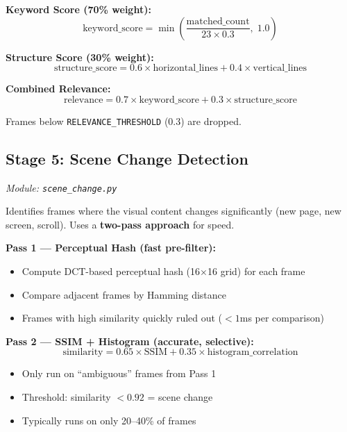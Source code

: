 \documentclass[12pt, a4paper]{article}
\newcommand{\codeinline}[1]{\texttt{\small\colorbox{codebg}{#1}}}
\newcommand{\filepath}[1]{\texttt{\small #1}}
\begin{document}
\textbf{Keyword Score (70\% weight):}
\begin{equation}
    \text{keyword\_score} = \min\!\left(\frac{\text{matched\_count}}{23 \times 0.3},\; 1.0\right)
\end{equation}

\textbf{Structure Score (30\% weight):}
\begin{equation}
    \text{structure\_score} = 0.6 \times \text{horizontal\_lines} + 0.4 \times \text{vertical\_lines}
\end{equation}

\textbf{Combined Relevance:}
\begin{equation}
    \text{relevance} = 0.7 \times \text{keyword\_score} + 0.3 \times \text{structure\_score}
\end{equation}

Frames below \codeinline{RELEVANCE\_THRESHOLD} (0.3) are dropped.

\subsection{Stage 5: Scene Change Detection}
\label{sec:adaptive}
\textit{Module: \filepath{scene\_change.py}}

Identifies frames where the visual content changes significantly (new page, new screen, scroll). Uses a \textbf{two-pass approach} for speed.

\textbf{Pass 1 --- Perceptual Hash (fast pre-filter):}
\begin{itemize}
    \item Compute DCT-based perceptual hash (16$\times$16 grid) for each frame
    \item Compare adjacent frames by Hamming distance
    \item Frames with high similarity quickly ruled out ($< 1$ms per comparison)
\end{itemize}

\textbf{Pass 2 --- SSIM + Histogram (accurate, selective):}
\begin{equation}
    \text{similarity} = 0.65 \times \text{SSIM} + 0.35 \times \text{histogram\_correlation}
\end{equation}

\begin{itemize}
    \item Only run on ``ambiguous'' frames from Pass 1
    \item Threshold: similarity $< 0.92$ = scene change
    \item Typically runs on only 20--40\% of frames
\end{itemize}
\end{document}
